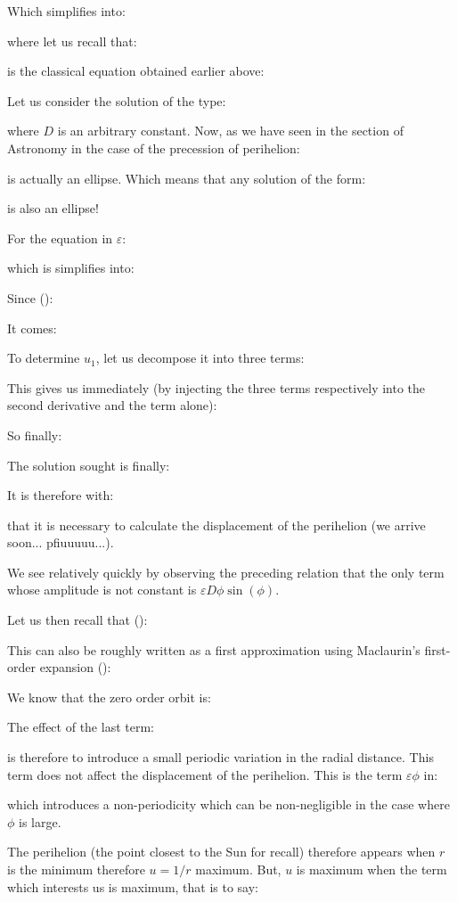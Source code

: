 	Which simplifies into:
	
	where let us recall that:
	
	is the classical equation obtained earlier above:
	
	Let us consider the solution of the type:
	
	where $D$ is an arbitrary constant. Now, as we have seen in the section of Astronomy in the case of the precession of perihelion:
	
	is actually an ellipse. Which means that any solution of the form:
	
	is also an ellipse!
	
	For the equation in $\varepsilon$:
	
	which is simplifies into:
	
	Since ():
	
	It comes:
	
	To determine $u_1$, let us decompose it into three terms:
	
	This gives us immediately (by injecting the three terms respectively into the second derivative and the term alone):
	
	So finally:
	
	The solution sought is finally:
	
	It is therefore with:
	
	that it is necessary to calculate the displacement of the perihelion (we arrive soon... pfiuuuuu...).
	
	We see relatively quickly by observing the preceding relation that the only term whose amplitude is not constant is $\varepsilon D\phi\sin(\phi)$.

	Let us then recall that ():
	
	This can also be roughly written as a first approximation using Maclaurin's first-order expansion ():
	
	We know that the zero order orbit is:
	
	The effect of the last term:
	
	is therefore to introduce a small periodic variation in the radial distance. This term does not affect the displacement of the perihelion. This is the term $\varepsilon\phi$ in:
	
	which introduces a non-periodicity which can be non-negligible in the case where $\phi$ is large.
	
	The perihelion (the point closest to the Sun for recall) therefore appears when $r$ is the minimum therefore $u=1/r$ maximum. But, $u$ is maximum when the term which interests us is maximum, that is to say:
	
